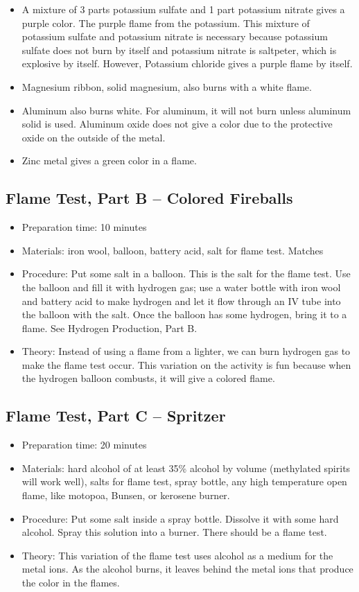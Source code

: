\begin{itemize}
\begin{itemize}
\item{A mixture of 3 parts potassium sulfate and 1 part potassium nitrate gives a purple color. The purple flame from the potassium. This mixture of potassium sulfate and potassium nitrate is necessary because potassium sulfate does not burn by itself and potassium nitrate is saltpeter, which is explosive by itself. However, Potassium chloride gives a purple flame by itself.}
\item{Magnesium ribbon, solid magnesium, also burns with a white flame.}
\item{Aluminum also burns white. For aluminum, it will not burn unless aluminum solid is used. Aluminum oxide does not give a color due to the protective oxide on the outside of the metal.}
\item{Zinc metal gives a green color in a flame.}
\end{itemize}
\end{itemize}

\subsection{Flame Test, Part B -- Colored Fireballs}
\begin{itemize}
\item{Preparation time: 10 minutes}
\item{Materials: iron wool, balloon, battery acid, salt for flame test. Matches}
\item{Procedure: Put some salt in a balloon. This is the salt for the flame test. Use the balloon and fill it with hydrogen gas; use a water bottle with iron wool and battery acid to make hydrogen and let it flow through an IV tube into the balloon with the salt. Once the balloon has some hydrogen, bring it to a flame. See Hydrogen Production, Part B.}
\item{Theory: Instead of using a flame from a lighter, we can burn hydrogen gas to make the flame test occur. This variation on the activity is fun because when the hydrogen balloon combusts, it will give a colored flame.}
\end{itemize}

\subsection{Flame Test, Part C -- Spritzer}
\begin{itemize}
\item{Preparation time: 20 minutes}
\item{Materials: hard alcohol of at least 35\% alcohol by volume (methylated spirits will work well), salts for flame test, spray bottle, any high temperature open flame, like motopoa, Bunsen, or kerosene burner.}
\item{Procedure: Put some salt inside a spray bottle. Dissolve it with some hard alcohol. Spray this solution into a burner. There should be a flame test.}
\item{Theory: This variation of the flame test uses alcohol as a medium for the metal ions. As the alcohol burns, it leaves behind the metal ions that produce the color in the flames.}
\end{itemize}

